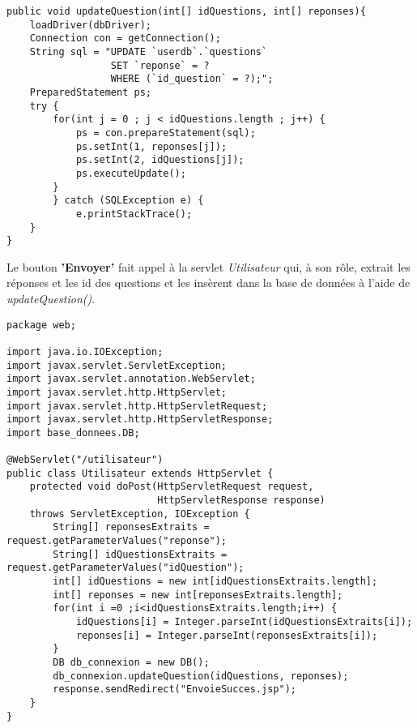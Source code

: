 \documentclass[12]{article}
\begin{document}
\lstset{language=java}
\begin{lstlisting}
public void updateQuestion(int[] idQuestions, int[] reponses){
	loadDriver(dbDriver);
	Connection con = getConnection();
	String sql = "UPDATE `userdb`.`questions` 
				  SET `reponse` = ? 
				  WHERE (`id_question` = ?);";
	PreparedStatement ps;
	try {
		for(int j = 0 ; j < idQuestions.length ; j++) {
			ps = con.prepareStatement(sql);
			ps.setInt(1, reponses[j]);
			ps.setInt(2, idQuestions[j]);
			ps.executeUpdate();
		}
		} catch (SQLException e) {
			e.printStackTrace();
	}
}
\end{lstlisting}



Le bouton \textbf{'Envoyer'} fait appel à la servlet \textit{Utilisateur} qui, à son rôle, extrait les réponses et les id des questions et les insèrent dans la base de données à l'aide de \textit{updateQuestion()}.



\begin{small}

\begin{lstlisting}
package web;

import java.io.IOException;
import javax.servlet.ServletException;
import javax.servlet.annotation.WebServlet;
import javax.servlet.http.HttpServlet;
import javax.servlet.http.HttpServletRequest;
import javax.servlet.http.HttpServletResponse;
import base_donnees.DB;

@WebServlet("/utilisateur")
public class Utilisateur extends HttpServlet {
	protected void doPost(HttpServletRequest request, 
						  HttpServletResponse response) 
	throws ServletException, IOException {
		String[] reponsesExtraits = request.getParameterValues("reponse");
		String[] idQuestionsExtraits = request.getParameterValues("idQuestion");
		int[] idQuestions = new int[idQuestionsExtraits.length];
		int[] reponses = new int[reponsesExtraits.length];
		for(int i =0 ;i<idQuestionsExtraits.length;i++) {
			idQuestions[i] = Integer.parseInt(idQuestionsExtraits[i]);
			reponses[i] = Integer.parseInt(reponsesExtraits[i]);
		}
		DB db_connexion = new DB();
		db_connexion.updateQuestion(idQuestions, reponses);		
		response.sendRedirect("EnvoieSucces.jsp");
	}
}
\end{lstlisting}
\end{small}
\end{document}
